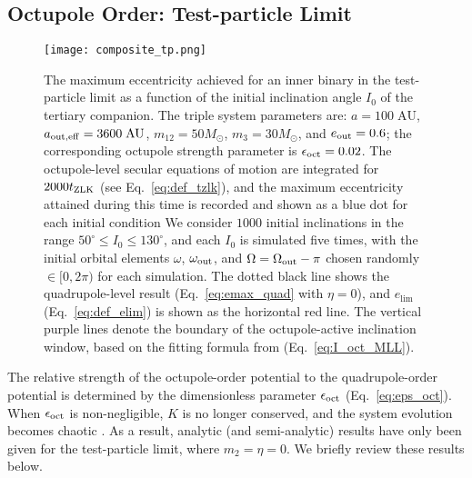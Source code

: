 \documentclass[
        fleqn,
        usenatbib,
    ]{mnras}
\newlength{\colummwidth}
\begin{document}
\subsection{Octupole Order: Test-particle Limit}\label{ss:oct_tp}

\begin{figure}
    \centering
    \texttt{[image: composite\_tp.png]}
    \caption{The maximum eccentricity achieved for an inner binary in the
    test-particle limit as a function of the initial inclination angle $I_0$ of
    the tertiary companion. The triple system parameters are:
    $a = 100\;\mathrm{AU}$, $a_{\rm out, eff} = 3600\;\mathrm{AU}$, $m_{12}
    = 50M_{\odot}$, $m_3 = 30M_{\odot}$, and $e_{\rm out} = 0.6$; the
    corresponding octupole strength parameter is $\epsilon_{\rm oct} = 0.02$.
    The octupole-level secular equations of motion are integrated for
    $2000t_{\rm ZLK}$ (see Eq.~\ref{eq:def_tzlk}), and the maximum
    eccentricity attained during this time is recorded and shown as a blue dot
    for each initial condition We consider $1000$ initial inclinations in the
    range $50^\circ \leq I_0 \leq 130^\circ$, and each $I_0$ is simulated five
    times, with the initial orbital elements $\omega$, $\omega_{\rm out}$, and
    $\Omega = \Omega_{\rm out} - \pi$ chosen randomly $\in [0, 2\pi)$ %
    for each simulation. The dotted black line shows the quadrupole-level result
    (Eq.~\ref{eq:emax_quad} with $\eta = 0$), and $e_{\lim}$
    (Eq.~\ref{eq:def_elim}) is shown as the horizontal red line. The vertical
    purple lines denote the boundary of the octupole-active inclination window,
    based on the fitting formula from \citet{MLL16} (Eq.~\ref{eq:I_oct_MLL}).
    }\label{fig:composite_tp}
\end{figure}

The relative strength of the octupole-order potential to the quadrupole-order
potential is determined by the dimensionless parameter $\epsilon_{\rm oct}$
(Eq.~\ref{eq:eps_oct}). When $\epsilon_{\rm oct}$ is non-negligible, $K$ is no
longer conserved, and the system evolution becomes chaotic
\citep{ford2000secular, katz2011long, lithwick2011eccentric, li2014chaos,
LML15}. As a result, analytic (and semi-analytic) results have only been given
for the test-particle limit, where $m_2 = \eta = 0$. We briefly review these
results below.
\end{document}
